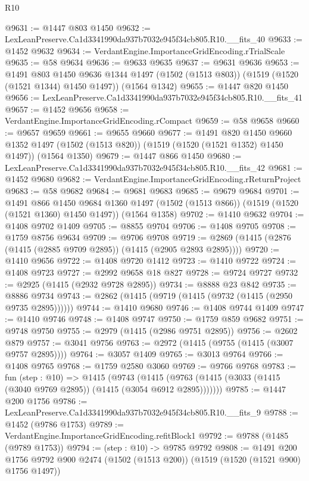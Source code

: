 \begin{lexlean}{R10}
\begin{coremodule}
@9631 := @1447 @803 @1450
@9632 := LexLeanPreserve.Ca1d3341990da937b7032e945f34cb805.R10.__fits_40
@9633 := @1452 @9632
@9634 := VerdantEngine.ImportanceGridEncoding.rTrialScale
@9635 := @58 @9634
@9636 := @9633 @9635
@9637 := @9631 @9636
@9653 := @1491
    @803
    @1450
    @9636
    @1344
    @1497
    (@1502 (@1513 @803))
    (@1519 (@1520 (@1521 @1344) @1450 @1497))
    (@1564 @1342)
@9655 := @1447 @820 @1450
@9656 := LexLeanPreserve.Ca1d3341990da937b7032e945f34cb805.R10.__fits_41
@9657 := @1452 @9656
@9658 := VerdantEngine.ImportanceGridEncoding.rCompact
@9659 := @58 @9658
@9660 := @9657 @9659
@9661 := @9655 @9660
@9677 := @1491
    @820
    @1450
    @9660
    @1352
    @1497
    (@1502 (@1513 @820))
    (@1519 (@1520 (@1521 @1352) @1450 @1497))
    (@1564 @1350)
@9679 := @1447 @866 @1450
@9680 := LexLeanPreserve.Ca1d3341990da937b7032e945f34cb805.R10.__fits_42
@9681 := @1452 @9680
@9682 := VerdantEngine.ImportanceGridEncoding.rReturnProject
@9683 := @58 @9682
@9684 := @9681 @9683
@9685 := @9679 @9684
@9701 := @1491
    @866
    @1450
    @9684
    @1360
    @1497
    (@1502 (@1513 @866))
    (@1519 (@1520 (@1521 @1360) @1450 @1497))
    (@1564 @1358)
@9702 := @1410 @9632
@9704 := @1408 @9702 @1409
@9705 := @8855 @9704
@9706 := @1408 @9705
@9708 := @1759 @8756 @9634
@9709 := @9706 @9708
@9719 := @2869 (@1415 (@2876 (@1415 (@2885 @9709 @2895)) (@1415 (@2905 @2893 @2895))))
@9720 := @1410 @9656
@9722 := @1408 @9720 @1412
@9723 := @1410 @9722
@9724 := @1408 @9723
@9727 := @2992 @9658 @18 @827
@9728 := @9724 @9727
@9732 := @2925 (@1415 (@2932 @9728 @2895))
@9734 := @8888 @23 @842
@9735 := @8886 @9734
@9743 := @2862 (@1415 (@9719 (@1415 (@9732 (@1415 (@2950 @9735 @2895))))))
@9744 := @1410 @9680
@9746 := @1408 @9744 @1409
@9747 := @1410 @9746
@9748 := @1408 @9747
@9750 := @1759 @859 @9682
@9751 := @9748 @9750
@9755 := @2979 (@1415 (@2986 @9751 @2895))
@9756 := @2602 @879
@9757 := @3041 @9756
@9763 := @2972 (@1415 (@9755 (@1415 (@3007 @9757 @2895))))
@9764 := @3057 @1409
@9765 := @3013 @9764
@9766 := @1408 @9765
@9768 := @1759 @2580 @3060
@9769 := @9766 @9768
@9783 := fun (step : @10) =>
  @1415
    (@9743 (@1415 (@9763 (@1415 (@3033 (@1415 (@3040 @9769 @2895)) (@1415 (@3054 @6912 @2895)))))))
@9785 := @1447 @200 @1756
@9786 := LexLeanPreserve.Ca1d3341990da937b7032e945f34cb805.R10.__fits_9
@9788 := @1452 (@9786 @1753)
@9789 := VerdantEngine.ImportanceGridEncoding.refitBlock1
@9792 := @9788 (@1485 (@9789 @1753))
@9794 := (step : @10) -> @9785 @9792
@9808 := @1491
    @200
    @1756
    @9792
    @900
    @2474
    (@1502 (@1513 @200))
    (@1519 (@1520 (@1521 @900) @1756 @1497))

\end{coremodule}
\end{lexlean}
